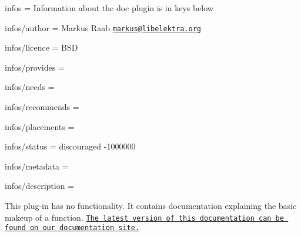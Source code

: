 
\begin{DoxyItemize}
\item infos = Information about the doc plugin is in keys below
\item infos/author = Markus Raab \href{mailto:markus@libelektra.org}{\tt markus@libelektra.\+org}
\item infos/licence = B\+S\+D
\item infos/provides =
\item infos/needs =
\item infos/recommends =
\item infos/placements =
\item infos/status = discouraged -\/1000000
\item infos/metadata =
\item infos/description =
\end{DoxyItemize}

This plug-\/in has no functionality. It contains documentation explaining the basic makeup of a function. \href{http://doc.libelektra.org/api/latest/html/group__plugin.html}{\tt The latest version of this documentation can be found on our documentation site.} 